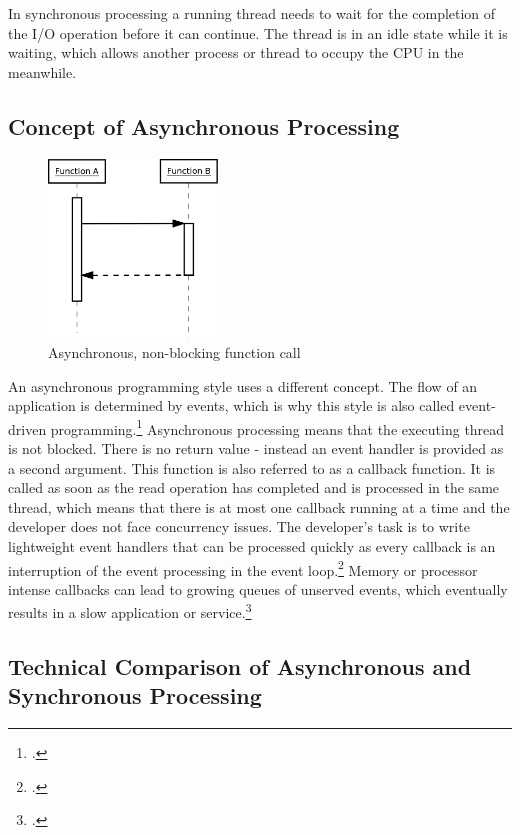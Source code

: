 In synchronous processing a running thread needs to wait for the completion of
the I/O operation before it can continue.
The thread is in an idle state while it is waiting, which allows another process 
or thread to occupy the CPU in the meanwhile.
\FloatBarrier
\subsection{Concept of Asynchronous Processing}
\label{concept_async}
\FloatBarrier

\begin{figure}[hbtp]
\centering
\includegraphics[width=0.4\textwidth]{img/asynch_call.png}
\caption{Asynchronous, non-blocking function call}
\label{fig:asynch_call}
\end{figure}

An asynchronous programming style uses a different concept. The flow of an
application is determined by events, which is why this style is also called
event-driven programming.\footcite[Cf.][16]{teixeira_2012} Asynchronous processing means
that the executing thread is not blocked. There is no
return value - instead an event handler is provided as a second argument.
This function is also referred to as a callback function. It is called as soon
as the read operation has completed and is processed in the same thread, which
means that there is at most one callback running at a time and the developer
does not face concurrency issues.
The developer’s task is to write lightweight event handlers that can be
processed quickly as every callback is an interruption of the event processing
in the event loop.\footcite[Cf.][]{Croucher_2012} Memory or processor intense
callbacks can lead to growing queues of unserved events, which eventually
results in a slow application or service.\footcite[Cf.][48]{teixeira_2012}


\subsection{Technical Comparison of Asynchronous and Synchronous Processing}
\label{comparison_syncasync}

